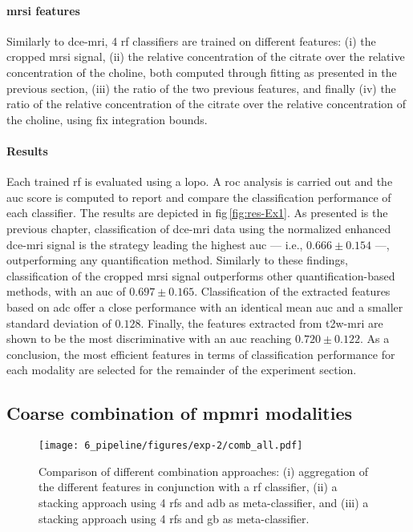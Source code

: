 \paragraph{\ac{mrsi} features} Similarly to \ac{dce}-\ac{mri}, 4 \ac{rf} classifiers are trained on different features:
(i) the cropped \ac{mrsi} signal,
(ii) the relative concentration of the citrate over the relative concentration of the choline, both computed through fitting as presented in the previous section,
(iii) the ratio of the two previous features, and finally
(iv) the ratio of the relative concentration of the citrate over the relative concentration of the choline, using fix integration bounds.

\paragraph{Results}
Each trained \ac{rf} is evaluated using a \ac{lopo}.
A \ac{roc} analysis is carried out and the \ac{auc} score is computed to report and compare the classification performance of each classifier.
The results are depicted in \acs{fig}\,\ref{fig:res-Ex1}.
As presented is the previous chapter, classification of \ac{dce}-\ac{mri} data using the normalized enhanced \ac{dce}-\ac{mri} signal is the strategy leading the highest \ac{auc} --- i.e., $0.666 \pm 0.154$ ---, outperforming any quantification method.
Similarly to these findings, classification of the cropped \ac{mrsi} signal outperforms other quantification-based methods, with an \ac{auc} of $0.697 \pm 0.165$.
Classification of the extracted features based on \ac{adc} offer a close performance with an identical mean \ac{auc} and a smaller standard deviation of $0.128$.
Finally, the features extracted from \ac{t2w}-\ac{mri} are shown to be the most discriminative with an \ac{auc} reaching $0.720 \pm 0.122$.
As a conclusion, the most efficient features in terms of classification performance for each modality are selected for the remainder of the experiment section.

\subsection{Coarse combination of \acs*{mpmri} modalities} \label{subsec:chp6:exp-res:Ex2}

\begin{figure}
  \centering
  \texttt{[image: 6\_pipeline/figures/exp-2/comb\_all.pdf]}
  \caption[Comparison of different combination approaches.]{Comparison of different combination approaches: (i) aggregation of the different features in conjunction with a \acs*{rf} classifier, (ii) a stacking approach using 4 \acs*{rf}s and \acs*{adb} as meta-classifier, and (iii) a stacking approach using 4 \acs*{rf}s and \acs*{gb} as meta-classifier.}
  \label{fig:res-Exp2}
\end{figure}

